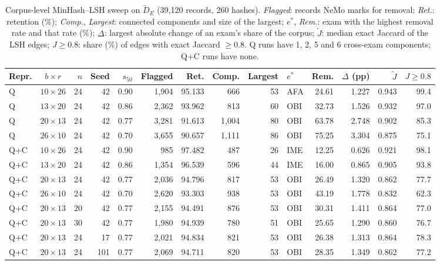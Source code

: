\begin{table}[t]
\centering
\small
\setlength{\tabcolsep}{3.5pt}
\begin{tabular}{@{}lcrrrrrrrlrrrr@{}}
\toprule
Repr. & $b{\times}r$ & $n$ & Seed & $s_{50}$ & Flagged & Ret. & Comp. & Largest & $e^{*}$ & Rem. & $\Delta$ (pp) & $\tilde J$ & $J{\ge}0.8$ \\
\midrule
Q & $10{\times}26$ & 24 & 42 & 0.90 & 1,904 & 95.133 & 666 & 53 & AFA & 24.61 & 1.227 & 0.943 & 99.4 \\
Q & $13{\times}20$ & 24 & 42 & 0.86 & 2,362 & 93.962 & 813 & 60 & OBI & 32.73 & 1.526 & 0.932 & 97.0 \\
Q & $20{\times}13$ & 24 & 42 & 0.77 & 3,281 & 91.613 & 1,004 & 80 & OBI & 63.78 & 2.748 & 0.902 & 85.3 \\
Q & $26{\times}10$ & 24 & 42 & 0.70 & 3,655 & 90.657 & 1,111 & 86 & OBI & 75.25 & 3.304 & 0.875 & 75.1 \\
\midrule
Q+C & $10{\times}26$ & 24 & 42 & 0.90 & 985 & 97.482 & 487 & 26 & IME & 12.25 & 0.626 & 0.921 & 98.1 \\
Q+C & $13{\times}20$ & 24 & 42 & 0.86 & 1,354 & 96.539 & 596 & 44 & IME & 16.00 & 0.865 & 0.905 & 93.8 \\
Q+C & $20{\times}13$ & 24 & 42 & 0.77 & 2,036 & 94.796 & 817 & 53 & OBI & 26.49 & 1.320 & 0.862 & 77.7 \\
Q+C & $26{\times}10$ & 24 & 42 & 0.70 & 2,620 & 93.303 & 938 & 53 & OBI & 43.19 & 1.778 & 0.832 & 62.3 \\
\midrule
Q+C & $20{\times}13$ & 20 & 42 & 0.77 & 2,155 & 94.491 & 876 & 53 & OBI & 30.31 & 1.411 & 0.864 & 77.0 \\
Q+C & $20{\times}13$ & 30 & 42 & 0.77 & 1,980 & 94.939 & 780 & 51 & OBI & 25.65 & 1.290 & 0.860 & 76.7 \\
Q+C & $20{\times}13$ & 24 & 17 & 0.77 & 2,021 & 94.834 & 821 & 53 & OBI & 26.38 & 1.313 & 0.864 & 78.3 \\
Q+C & $20{\times}13$ & 24 & 101 & 0.77 & 2,069 & 94.711 & 820 & 53 & OBI & 28.35 & 1.349 & 0.862 & 77.2 \\
\bottomrule
\end{tabular}
\caption{Corpus-level MinHash--LSH sweep on $\tilde D_E$ (39,120 records,
260 hashes). \emph{Flagged}: records NeMo marks for removal; \emph{Ret.}:
retention (\%); \emph{Comp.}, \emph{Largest}: connected components and size
of the largest; $e^{*}$, \emph{Rem.}: exam with the highest removal rate and
that rate (\%); $\Delta$: largest absolute change of an exam's share of the
corpus; $\tilde J$: median exact Jaccard of the LSH edges; $J{\ge}0.8$: share
(\%) of edges with exact Jaccard $\ge 0.8$. Q runs have 1, 2, 5 and 6
cross-exam components; Q+C runs have none.}
\label{tab:dedup-sweep}
\end{table}

